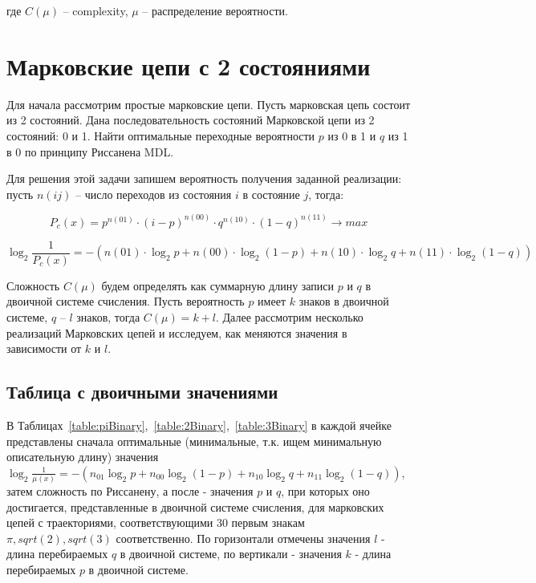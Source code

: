 \documentclass[12pt]{article}
\begin{document}
	где $C(\mu)$ -- complexity, $\mu$ -- распределение вероятности.
	
	\section*{Марковские цепи с 2 состояниями}
	Для начала рассмотрим простые марковские цепи. Пусть марковская цепь состоит из 2 состояний. Дана последовательность состояний Марковской цепи из 2 состояний: 0 и 1. Найти оптимальные переходные вероятности $p$ из 0 в 1 и $q$ из 1 в 0 по принципу Риссанена MDL. 
	
	Для решения этой задачи запишем вероятность получения заданной реализации: пусть $n(ij)$ -- число переходов из состояния $i$ в состояние $j$, тогда:
	
	\begin{equation}P_c(x) = p^{n(01)}\cdot(i-p)^{n(00)}\cdot q^{n(10)}\cdot(1-q)^{n(11)}\to max\end{equation}
	
	\begin{equation}\label{log}\log_2{\frac{1}{P_c(x)}}=-(n(01)\cdot\log_2{p}+n(00)\cdot\log_2{(1-p)}+n(10)\cdot\log_2{q}+n(11)\cdot\log_2{(1-q)})\end{equation}
	
	Сложность $C(\mu)$ будем определять как суммарную длину записи $p$ и $q$ в двоичной системе счисления. Пусть вероятность $p$ имеет $k$ знаков в двоичной системе, $q$ -- $l$ знаков, тогда $C(\mu)=k+l$. Далее рассмотрим несколько реализаций Марковских цепей и исследуем, как меняются значения в зависимости от $k$ и $l$.
	
	\subsection*{Таблица с двоичными значениями}
	В Таблицах~\ref{table:piBinary},~\ref{table:2Binary},~\ref{table:3Binary} в каждой ячейке представлены сначала оптимальные (минимальные, т.к. ищем минимальную описательную длину) значения $\log_2{\frac{1}{\mu(x)}}=-(n_{01}\log_2{p}+n_{00}\log_2{(1-p)}+n_{10}\log_2{q}+n_{11}\log_2{(1-q)})$, затем сложность по Риссанену, а после - значения $p$ и $q$, при которых оно достигается, представленные в двоичной системе счисления, для марковских цепей с траекториями, соответствующими 30 первым знакам $\pi, sqrt(2), sqrt(3)$ соответственно. По горизонтали отмечены значения $l$ - длина перебираемых $q$  в двоичной системе, по вертикали - значения $k$ - длина перебираемых $p$  в двоичной системе.
	
\end{document}
